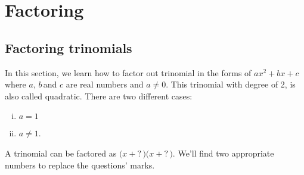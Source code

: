 \chapter{Factoring}
\section{Factoring trinomials}
In this section, we learn how to factor out trinomial in the forms of $ax^2+bx+c$ where $a,\,b\,$and $c$ are real numbers and $a\neq0$. This trinomial with degree of 2, is also called quadratic.
There are two different cases:
\begin{enumerate}[i.]
    \item $a=1$
    \item $a\neq1$.
\end{enumerate}
A trinomial can be factored as $\bigl(x+\boxed{?}\,\bigr)\bigl(x+\boxed{?}\,\bigr)$. We'll find two appropriate numbers to replace the questions' marks.

